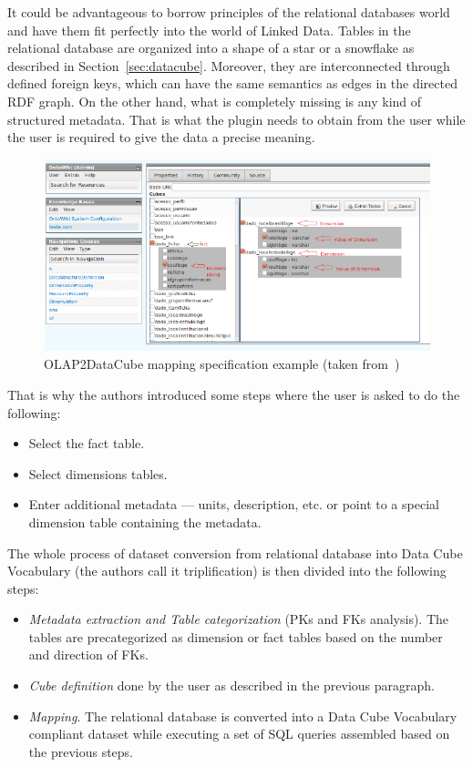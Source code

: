 It could be advantageous to borrow principles of the relational databases world and have them
fit perfectly into the world of Linked Data. Tables in the relational database 
are organized into a shape of a star or a snowflake as described in Section~\ref{sec:datacube}.
Moreover, they are interconnected through defined foreign keys,
which can have the same semantics as edges in the directed RDF graph.
On the other hand, what is completely missing is any kind of structured
metadata. That is what the plugin needs to obtain from the user while the user
is required to give the data a precise meaning.

\begin{figure}
	\centering
	\includegraphics[width=140mm]{img/olapimport.png}
	\caption{OLAP2DataCube mapping specification example (taken from~\cite{olap2dc-paper})}
	\label{fig:olap2dc-screen}
\end{figure}


That is why the authors introduced some steps where the user is asked to 
do the following:
\begin{itemize}
  \item Select the fact table.
  \item Select dimensions tables.
  \item Enter additional metadata --- units, description, etc. or point to a 
  special dimension table containing the metadata.
\end{itemize}

The whole process of dataset conversion from relational database into Data Cube Vocabulary
(the authors call it triplification) is then divided into the following steps:
\begin{itemize}
  \item \emph{Metadata extraction and Table categorization} (PKs and FKs analysis). The 
  tables are precategorized as dimension or fact tables based on the number and 
  direction of FKs.
  \item \emph{Cube definition} done by the user as described in the previous paragraph.
  \item \emph{Mapping}. The relational database is converted into a Data Cube 
  Vocabulary compliant dataset while executing a set of SQL queries assembled 
  based on the previous steps.
\end{itemize}

